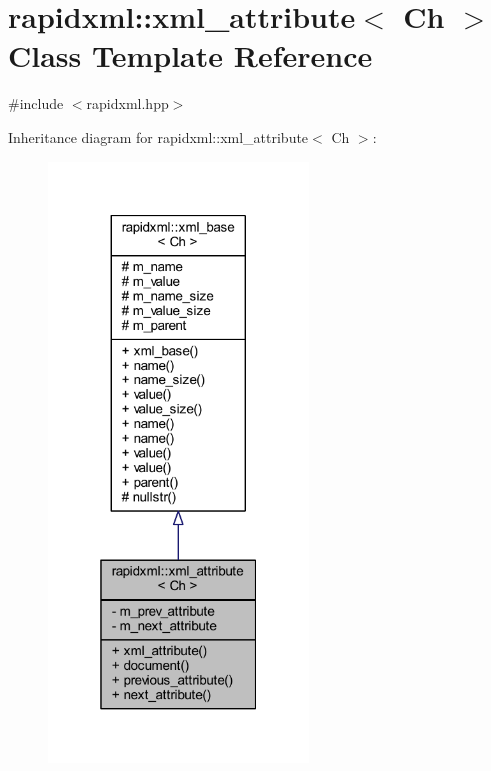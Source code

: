 \hypertarget{singletonrapidxml_1_1xml__attribute}{\section{rapidxml\+:\+:xml\+\_\+attribute$<$ Ch $>$ Class Template Reference}
\label{singletonrapidxml_1_1xml__attribute}
}


{\ttfamily \#include $<$rapidxml.\+hpp$>$}



Inheritance diagram for rapidxml\+:\+:xml\+\_\+attribute$<$ Ch $>$\+:
\nopagebreak
\begin{figure}[H]
\begin{center}
\leavevmode
\includegraphics[width=196pt]{singletonrapidxml_1_1xml__attribute__inherit__graph}
\end{center}
\end{figure}


